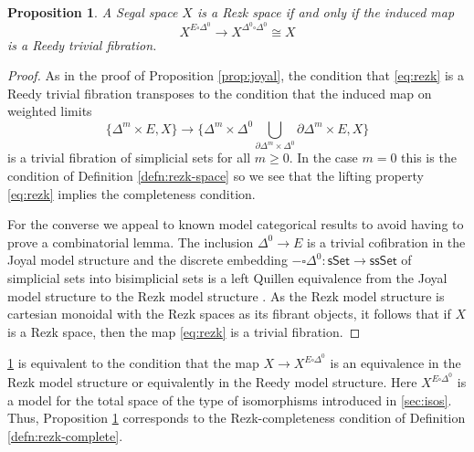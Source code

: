 \documentclass{amsart}
\theoremstyle{plain}
\newtheorem{prop}[thm]{Proposition}
\theoremstyle{definition}
\theoremstyle{remark}
\numberwithin{equation}{section}
\newcommand{\sSet}{\mathsf{sSet}}
\newcommand{\ssSet}{\mathsf{ssSet}}
\begin{document}
\begin{prop}\label{prop:rezk-space} A Segal space $X$ is a Rezk space if and only if the induced map
\begin{equation}\label{eq:rezk} X^{E \square \Delta^0} \to X^{\Delta^0 \square \Delta^0} \cong X
\end{equation}
is a Reedy trivial fibration.
\end{prop}
\begin{proof}
As in the proof of Proposition \ref{prop:joyal}, the condition that \eqref{eq:rezk} is a Reedy trivial fibration
transposes to the condition that  the induced map on weighted limits
\[ \{ \Delta^m \times E, X\} \to \{ \Delta^m \times \Delta^0 \bigcup\limits_{\partial\Delta^m\times \Delta^0} \partial\Delta^m \times E, X\}\] is a trivial fibration of simplicial sets for all $m \geq 0$. In the case $m=0$ this is the condition of Definition \ref{defn:rezk-space} so we see that the lifting property \eqref{eq:rezk} implies the completeness condition.

For the converse we appeal to known model categorical results to avoid having to prove a combinatorial lemma. The inclusion $\Delta^0 \to E$ is a trivial cofibration in the Joyal model structure and the discrete embedding $-\square\Delta^0 \colon \sSet \to \ssSet$ of simplicial sets into bisimplicial sets is a left Quillen equivalence from the Joyal model structure to the Rezk model structure \cite[4.11]{JT}. As the Rezk model structure is cartesian monoidal with the Rezk spaces as its fibrant objects, it follows that if $X$ is a Rezk space, then the map \eqref{eq:rezk} is a trivial fibration.
\end{proof}


\cref{prop:rezk-space} is equivalent to the condition that the map $X \to X^{E \square\Delta^0}$ is an equivalence in the Rezk model structure or equivalently in the Reedy model structure. Here $X^{E\square\Delta^0}$ is a model for the total space of the type of isomorphisms introduced in \cref{sec:isos}. Thus, Proposition \ref{prop:rezk-space} corresponds to the Rezk-completeness condition of Definition \ref{defn:rezk-complete}.
\end{document}
